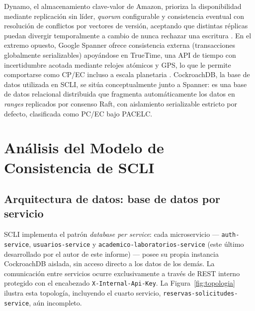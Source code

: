 \documentclass[12pt,letterpaper]{article}
\begin{document}
Dynamo, el almacenamiento clave-valor de Amazon, prioriza la disponibilidad
mediante replicaci\'on sin l\'ider, \emph{quorum} configurable y
consistencia eventual con resoluci\'on de conflictos por vectores de
versi\'on, aceptando que distintas r\'eplicas puedan divergir
temporalmente a cambio de nunca rechazar una escritura \cite{decandia2007}.
En el extremo opuesto, Google Spanner ofrece consistencia externa
(transacciones globalmente serializables) apoy\'andose en TrueTime, una API
de tiempo con incertidumbre acotada mediante relojes at\'omicos y GPS, lo
que le permite comportarse como CP/EC incluso a escala planetaria
\cite{corbett2013}. CockroachDB, la base de datos utilizada en SCLI, se
sit\'ua conceptualmente junto a Spanner: es una base de datos relacional
distribuida que fragmenta autom\'aticamente los datos en \emph{ranges}
replicados por consenso Raft, con aislamiento serializable estricto por
defecto, clasificada como PC/EC bajo PACELC.

\section{An\'alisis del Modelo de Consistencia de SCLI}
\label{sec:analisis}

\subsection{Arquitectura de datos: base de datos por servicio}

SCLI implementa el patr\'on \emph{database per service}: cada
microservicio --- \texttt{auth-service}, \texttt{usuarios-service} y
\texttt{academico-laboratorios-service} (este \'ultimo desarrollado por el
autor de este informe) --- posee su propia instancia CockroachDB aislada,
sin acceso directo a los datos de los dem\'as. La comunicaci\'on entre
servicios ocurre exclusivamente a trav\'es de REST interno protegido con
el encabezado \texttt{X-Internal-Api-Key}. La Figura~\ref{fig:topologia}
ilustra esta topolog\'ia, incluyendo el cuarto servicio,
\texttt{reservas-solicitudes-service}, a\'un incompleto.
\end{document}
